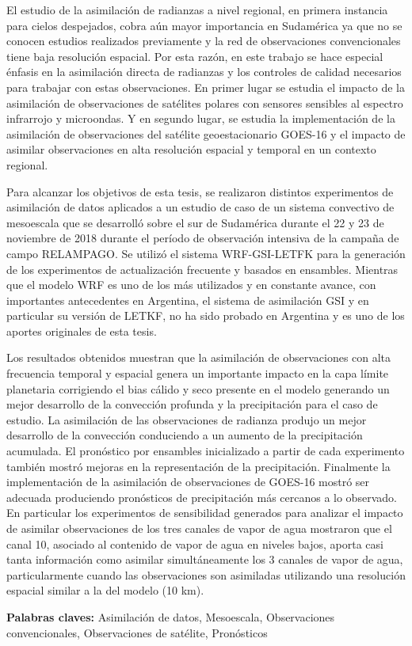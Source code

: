 \documentclass[12pt,oneside,a4paper]{reedthesis}
\begin{document}
\begin{resumen}
    El estudio de la asimilación de radianzas a nivel regional, en primera instancia para cielos despejados, cobra aún mayor importancia en Sudamérica ya que no se conocen estudios realizados previamente y la red de observaciones convencionales tiene baja resolución espacial. Por esta razón, en este trabajo se hace especial énfasis en la asimilación directa de radianzas y los controles de calidad necesarios para trabajar con estas observaciones. En primer lugar se estudia el impacto de la asimilación de observaciones de satélites polares con sensores sensibles al espectro infrarrojo y microondas. Y en segundo lugar, se estudia la implementación de la asimilación de observaciones del satélite geoestacionario GOES-16 y el impacto de asimilar observaciones en alta resolución espacial y temporal en un contexto regional.
    
    Para alcanzar los objetivos de esta tesis, se realizaron distintos experimentos de asimilación de datos aplicados a un estudio de caso de un sistema convectivo de mesoescala que se desarrolló sobre el sur de Sudamérica durante el 22 y 23 de noviembre de 2018 durante el período de observación intensiva de la campaña de campo RELAMPAGO. Se utilizó el sistema WRF-GSI-LETFK para la generación de los experimentos de actualización frecuente y basados en ensambles. Mientras que el modelo WRF es uno de los más utilizados y en constante avance, con importantes antecedentes en Argentina, el sistema de asimilación GSI y en particular su versión de LETKF, no ha sido probado en Argentina y es uno de los aportes originales de esta tesis.
    
    Los resultados obtenidos muestran que la asimilación de observaciones con alta frecuencia temporal y espacial genera un importante impacto en la capa límite planetaria corrigiendo el bias cálido y seco presente en el modelo generando un mejor desarrollo de la convección profunda y la precipitación para el caso de estudio. La asimilación de las observaciones de radianza produjo un mejor desarrollo de la convección conduciendo a un aumento de la precipitación acumulada. El pronóstico por ensambles inicializado a partir de cada experimento también mostró mejoras en la representación de la precipitación. Finalmente la implementación de la asimilación de observaciones de GOES-16 mostró ser adecuada produciendo pronósticos de precipitación más cercanos a lo observado. En particular los experimentos de sensibilidad generados para analizar el impacto de asimilar observaciones de los tres canales de vapor de agua mostraron que el canal 10, asociado al contenido de vapor de agua en niveles bajos, aporta casi tanta información como asimilar simultáneamente los 3 canales de vapor de agua, particularmente cuando las observaciones son asimiladas utilizando una resolución espacial similar a la del modelo (10 km).
    
    \textbf{Palabras claves:} Asimilación de datos, Mesoescala, Observaciones convencionales, Observaciones de satélite, Pronósticos
  \end{resumen}
\end{document}
